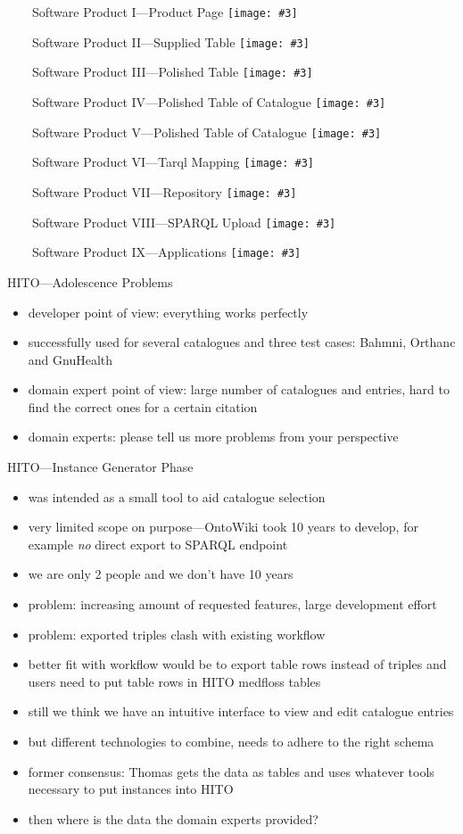 \documentclass[aspectratio=1610]{beamer}
\newcommand{\imageslide}[4][]
{
\begin{frame}[plain]{~~~~#2}
\vspace{0.2em}
\centering\texttt{[image: \#3]}
\\#1
\note{#4}
\end{frame}
}
\begin{document}
\imageslide{Software Product I---Product Page}{img/bahmni-example2.png}{}
\imageslide{Software Product II---Supplied Table}{img/bahmni-xslx.png}{}
\imageslide{Software Product III---Polished Table}{img/bahmni-polished.png}{}
\imageslide{Software Product IV---Polished Table of Catalogue}{img/whodhi-single.png}{}
\imageslide{Software Product V---Polished Table of Catalogue}{img/whodhi-all.png}{}
\imageslide{Software Product VI---Tarql Mapping}{img/hitocsv2rdf.png}{}
\imageslide{Software Product VII---Repository}{img/hitogithub.png}{}
\imageslide{Software Product VIII---SPARQL Upload}{img/hitosparql.png}{}
\imageslide{Software Product IX---Applications}{img/lodview.png}{}

\begin{frame}{HITO---Adolescence Problems}
\begin{itemize}
  \item developer point of view: everything works perfectly
  \item successfully used for several catalogues and three test cases: Bahmni, Orthanc and GnuHealth
  \item domain expert point of view: large number of catalogues and entries, hard to find the correct ones for a certain citation
  \item domain experts: please tell us more problems from your perspective
\end{itemize}
\end{frame}

\begin{frame}{HITO---Instance Generator Phase}
\begin{itemize}
  \item was intended as a small tool to aid catalogue selection
  \item very limited scope on purpose---OntoWiki took 10 years to develop, for example \emph{no} direct export to SPARQL endpoint
  \item we are only 2 people and we don't have 10 years
  \item problem: increasing amount of requested features, large development effort
  \item problem: exported triples clash with existing workflow
  \item better fit with workflow would be to export table rows instead of triples and users need to put table rows in HITO medfloss tables
  \item still we think we have an intuitive interface to view and edit catalogue entries
  \item but different technologies to combine, needs to adhere to the right schema
  \item former consensus: Thomas gets the data as tables and uses whatever tools necessary to put instances into HITO
  \item then where is the data the domain experts provided?
\end{itemize}
\end{frame}
\end{document}
